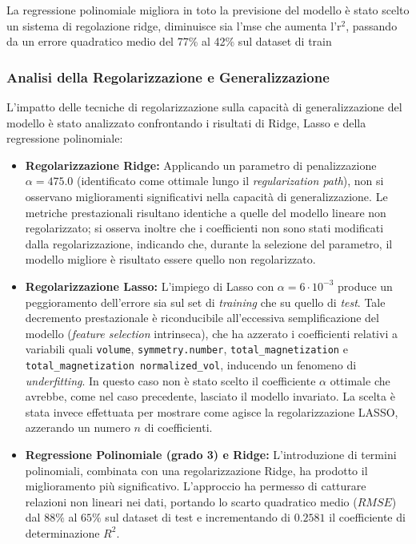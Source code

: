 \documentclass[a4paper,11pt]{article}
\begin{document}
La regressione polinomiale migliora in toto la previsione del modello è stato scelto un sistema di regolazione ridge, diminuisce sia l'mse che aumenta l'r$^2$, passando da un errore quadratico medio del 77\% al 42\% sul dataset di train
\fi
\subsubsection*{Analisi della Regolarizzazione e Generalizzazione}

L'impatto delle tecniche di regolarizzazione sulla capacità di generalizzazione del modello è stato analizzato confrontando i risultati di Ridge, Lasso e della regressione polinomiale:

\begin{itemize}
    \item \textbf{Regolarizzazione Ridge:} Applicando un parametro di penalizzazione $\alpha = 475.0$ (identificato come ottimale lungo il \textit{regularization path}), non si osservano miglioramenti significativi nella capacità di generalizzazione. Le metriche prestazionali risultano identiche a quelle del modello lineare non regolarizzato; si osserva inoltre che i coefficienti non sono stati modificati dalla regolarizzazione, indicando che, durante la selezione del parametro, il modello migliore è risultato essere quello non regolarizzato.
    
    \item \textbf{Regolarizzazione Lasso:} L'impiego di Lasso con $\alpha = 6 \cdot 10^{-3}$ produce un peggioramento dell'errore sia sul set di \textit{training} che su quello di \textit{test}. Tale decremento prestazionale è riconducibile all'eccessiva semplificazione del modello (\textit{feature selection} intrinseca), che ha azzerato i coefficienti relativi a variabili quali \texttt{volume}, \texttt{symmetry.number}, \texttt{total\_magnetization} e \texttt{total\_magnetization normalized\_vol}, inducendo un fenomeno di \textit{underfitting}. In questo caso non è stato scelto il coefficiente $\alpha$ ottimale che avrebbe, come nel caso precedente, lasciato il modello invariato. La scelta è stata invece effettuata per mostrare come agisce la regolarizzazione LASSO, azzerando un numero $n$ di coefficienti.
    
    \item \textbf{Regressione Polinomiale (grado 3) e Ridge:} L'introduzione di termini polinomiali, combinata con una regolarizzazione Ridge, ha prodotto il miglioramento più significativo. L'approccio ha permesso di catturare relazioni non lineari nei dati, portando lo scarto quadratico medio ($RMSE$) dal $88\%$ al $65\%$ sul dataset di test e incrementando di $0.2581$ il coefficiente di determinazione $R^2$. 
\end{itemize}
\end{document}
